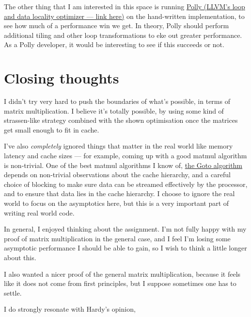 \documentclass[11pt]{article}
\begin{document}
The other thing that I am interested in this space is running 
\href{https://polly.llvm.org/}{Polly (LLVM's loop and data locality optimizer --- link here)} on the hand-written 
implementation, to see how much of a performance win we get. In
theory, Polly should perform additional tiling and other loop transformations
to eke out greater performance. As a Polly developer, it would be interesting
to see if this succeeds or not.



\section{Closing thoughts}
I didn't try very hard to push the boundaries of what's possible, in terms 
of matrix multiplication. I believe it's totally possible, by using some kind
of strassen-like strategy combined with the shown optimisation once the
matrices get small enough to fit in cache.

I've also \textit{completely} ignored things that matter in the real world
like memory latency and cache sizes --- for example, coming up with a good
matmul algorithm is non-trivial. One of the best matmul algorithms I know of,
\href{https://www.cs.utexas.edu/users/pingali/CS378/2008sp/papers/gotoPaper.pdf}{the Goto algorithm}
depends on non-trivial observations about the cache hierarchy,
and a careful choice of blocking to make sure data can be streamed effectively
by the processor, and to ensure that data lies in the cache hierarchy. I
choose to ignore the real world to focus on the asymptotics here, but this
is a very important part of writing real world code.

In general, I enjoyed thinking about the assignment. I'm not fully happy with
my proof of matrix multiplication in the general case, and I feel I'm
losing some asymptotic performance I should be able to gain, so I wish to
think a little longer about this.

I also wanted a nicer proof of the general matrix multiplication, because it
feels like it does not come from first principles, but I suppose sometimes one
has to settle.

I do strongly resonate with Hardy's opinion, 
\end{document}

